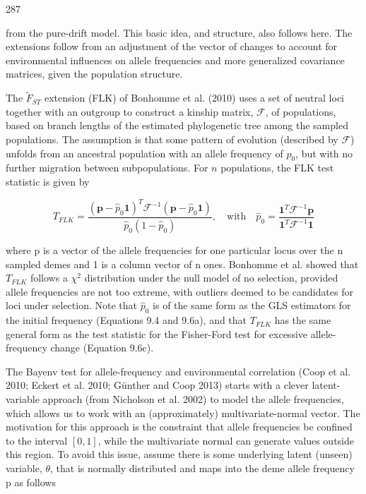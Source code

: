 \documentclass{article}
\begin{document}
287

from the pure-drift model. This basic idea, and structure, also follows here. The extensions follow from an adjustment of the vector of changes to account for environmental influences on allele frequencies and more generalized covariance matrices, given the population structure.

The  $ \tilde{F}_{ST} $ extension (FLK) of Bonhomme et al. (2010) uses a set of neutral loci together with an outgroup to construct a kinship matrix,  $ \mathcal{F} $, of populations, based on branch lengths of the estimated phylogenetic tree among the sampled populations. The assumption is that some pattern of evolution (described by  $ \mathcal{F} $) unfolds from an ancestral population with an allele frequency of  $ p_0 $, but with no further migration between subpopulations. For  $ n $ populations, the FLK test statistic is given by

\begin{equation}
T_{F L K}=\frac{(\mathbf{p}-\widehat{p}_{0}\mathbf{1})^{T}\mathcal{F}^{-1}(\mathbf{p}-\widehat{p}_{0}\mathbf{1})}{\widehat{p}_{0}(1-\widehat{p}_{0})},\quad\mathrm{w i t h}\quad\widehat{p}_{0}=\frac{\mathbf{1}^{T}\mathcal{F}^{-1}\mathbf{p}}{\mathbf{1}^{T}\mathcal{F}^{-1}\mathbf{1}}
\tag{9.12}
\label{eq:9_12}
\end{equation}

where p is a vector of the allele frequencies for one particular locus over the n sampled demes and 1 is a column vector of n ones. Bonhomme et al. showed that  $ T_{FLK} $ follows a  $ \chi^2 $ distribution under the null model of no selection, provided allele frequencies are not too extreme, with outliers deemed to be candidates for loci under selection. Note that  $ \widehat{p}_0 $ is of the same form as the GLS estimators for the initial frequency (Equations 9.4 and 9.6a), and that  $ T_{FLK} $ has the same general form as the test statistic for the Fisher-Ford test for excessive allele-frequency change (Equation 9.6c).

The Bayenv test for allele-frequency and environmental correlation (Coop et al. 2010; Eckert et al. 2010; Günther and Coop 2013) starts with a clever latent-variable approach (from Nicholson et al. 2002) to model the allele frequencies, which allows us to work with an (approximately) multivariate-normal vector. The motivation for this approach is the constraint that allele frequencies be confined to the interval  $ [0,1] $, while the multivariate normal can generate values outside this region. To avoid this issue, assume there is some underlying latent (unseen) variable,  $ \theta $, that is normally distributed and maps into the deme allele frequency p as follows
\end{document}
